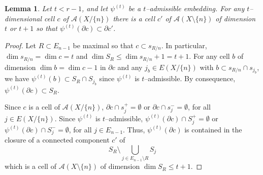 \documentclass[a4paper]{amsart}
\renewcommand{\d}{\partial}
\newtheorem{lemma}{Lemma}
\theoremstyle{definition}
\theoremstyle{remark}
\begin{document}
\begin{lemma}\label{lem:extendtraces}
  Let $t<r - 1$, and let $\psi^{(t)}$ be a $t$--admissible
  embedding. 
  For any $t$--dimensional cell $c$ of $\mathcal A(X/\{n\})$
  there is a cell $c'$ of $\mathcal A(X\setminus\{n\})$ of dimension
  $t$ or $t+1$ so that $\psi^{(t)}(\d c) \subset \d c'$.
\end{lemma}
\begin{proof}
  Let $R\subset E_{n-1}$ be maximal so that $c\subset s_{R/n}$. In
  particular, $\dim s_{R/n}=\dim c= t$ and $\dim S_R\le \dim s_{R/n} +1=
  t+1$. For any cell $b$ of dimension $\dim b=\dim c -1$ in $\d c$ and
  any $j_b\in E(X/\{n\})$ with $b\subset s_{R/n}\cap s_{j_b}$, we have
  $\psi^{(t)}(b)\subset S_R\cap S_{j_b}$ since $\psi^{(t)}$ is
  $t$--admissible. By consequence, $\psi^{(t)}(\d c)\subset S_R$.
  
  Since $c$ is a cell of $\mathcal A(X/\{n\})$, $\d c\cap
  s_j^+=\emptyset$ or $\d c\cap s_j^-=\emptyset$, for all $j\in
  E(X/\{n\})$.
%
  Since $\psi^{(t)}$ is $t$--admissible, $\psi^{(t)}(\d c)\cap
  S^+_j=\emptyset$ or $\psi^{(t)}(\d c)\cap S^-_j=\emptyset$, for all
  $j\in E_{n-1}$. Thus, $\psi^{(t)}(\d c)$ is contained in the closure
  of a connected component $c'$ of $$S_R\setminus \bigcup_{j\in
    E_{n-1}\setminus R} S_j$$ which is a cell of $\mathcal
  A(X\setminus\{n\})$ of dimension $\dim S_R\le t+1$.
\end{proof}
\end{document}
